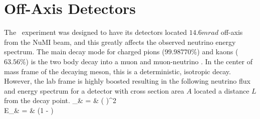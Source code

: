 \section{Off-Axis Detectors}

The \nova~experiment was designed to have its detectors located $14.6\unit{mrad}$ off-axis from the NuMI beam, and this greatly affects the observed neutrino energy spectrum. The main decay mode for charged pions ($99.98770\%$) and kaons ($63.56\%$) is the two body decay into a muon and muon-neutrino \cite{ref:PDG}. In the center of mass frame of the decaying meson, this is a deterministic, isotropic decay. However, the lab frame is highly boosted resulting in the following neutrino flux and energy spectrum for a detector with cross section area $A$ located a distance $L$ from the decay point.
\beqa
\phi_\nu & = & \left(  \right)^2  \label{eq:OffAxisFlux} \\
E_\nu & = & \left(1 -  \right)  \label{eq:OffAxisE}
\eeqa

